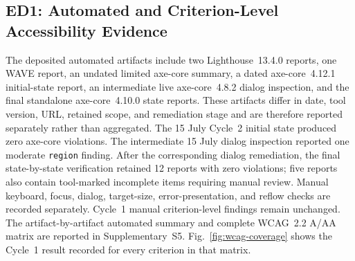 \documentclass[journal]{IEEEtran}
\begin{document}
\subsection{ED1: Automated and Criterion-Level Accessibility Evidence}
\label{subsec:auto-evaluation}

The deposited automated artifacts include two Lighthouse~13.4.0 reports, one WAVE report, an undated limited axe-core summary, a dated axe-core~4.12.1 initial-state report, an intermediate live axe-core~4.8.2 dialog inspection, and the final standalone axe-core~4.10.0 state reports. These artifacts differ in date, tool version, URL, retained scope, and remediation stage and are therefore reported separately rather than aggregated. The 15 July Cycle~2 initial state produced zero axe-core violations. The intermediate 15 July dialog inspection reported one moderate \texttt{region} finding. After the corresponding dialog remediation, the final state-by-state verification retained 12 reports with zero violations; five reports also contain tool-marked incomplete items requiring manual review. Manual keyboard, focus, dialog, target-size, error-presentation, and reflow checks are recorded separately. Cycle~1 manual criterion-level findings remain unchanged. The artifact-by-artifact automated summary and complete WCAG~2.2 A/AA matrix are reported in Supplementary~S5. Fig.~\ref{fig:wcag-coverage} shows the Cycle~1 result recorded for every criterion in that matrix.
\end{document}
